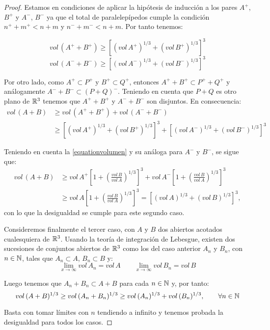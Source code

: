 \begin{proof}
Estamos en condiciones de aplicar la hipótesis de inducción a los pares $A^+$, $B^+$ y $A^-$, $B^-$ ya que el total de paralelepípedos cumple la condición $n^+ + m^+ < n + m$ y $n^- + m^- < n + m$. Por tanto tenemos:

\begin{equation*}
    vol \, (A^+ + B^+) \geq \left[ (vol \, A^+)^{1/3} + (vol \, B^+)^{1/3} \right]^3
\end{equation*}
\begin{equation*}
    vol \, (A^- + B^-) \geq \left[ (vol \, A^-)^{1/3} + (vol \, B^-)^{1/3} \right]^3
\end{equation*}

Por otro lado, como $A^+ \subset P^+$ y $B^+ \subset Q^+$, entonces $A^+ + B^+ \subset P^+ + Q^+$ y análogamente $A^- + B^- \subset (P+Q)^-$. Teniendo en cuenta que $P+Q$ es otro plano de $\mathbb{R}^3$ tenemos que $A^+ + B^+$ y $A^- + B^-$ son disjuntos. En consecuencia:
%
\begin{align*}
    vol \, (A+B) &\geq vol \,(A^+ + B^+) + vol \,(A^- + B^-) \\ 
    &\geq \left[ (vol \, A^+)^{1/3} + (vol \, B^+)^{1/3} \right]^3 + \left[ (vol \, A^-)^{1/3} + (vol \, B^-)^{1/3} \right]^3
\end{align*}

Teniendo en cuenta la \ref{equationvolumen} y su análoga para $A^-$ y $B^-$, se sigue que:
%
\begin{align*}
    vol \, (A+B) &\geq vol \, A^+ \left[ 1 + \left( \frac{vol \, B}{vol \, A} \right)^{1/3}  \right]^3 + vol \, A^- \left[ 1 + \left( \frac{vol \, B}{vol \, A} \right)^{1/3}  \right]^3 \\
    &\geq vol \, A \left[ 1 + \left( \frac{vol \, B}{vol \, A} \right)^{1/3}  \right]^3 = \left[ (vol \, A)^{1/3} + (vol \, B)^{1/3} \right]^3,
\end{align*}
%
con lo que la desigualdad se cumple para este segundo caso.

Consideremos finalmente el tercer caso, con $A$ y $B$ dos abiertos acotados cualesquiera de $\mathbb{R}^3$. Usando la teoría de integración de Lebesgue, existen dos sucesiones de conjuntos abiertos de $\mathbb{R}^3$ como los del caso anterior $A_n$ y $B_n$, con $n \in \mathbb{N}$, tales que $A_n \subset A$, $B_n \subset B$ y:
%
\begin{equation*}
    \lim_{x \to \infty} vol \, A_n = vol \, A \qquad \lim_{x \to \infty} vol \, B_n = vol \, B
\end{equation*}

Luego tenemos que $A_n + B_n \subset A + B$ para cada $n \in \mathbb{N}$ y, por tanto:
%
\begin{equation*}
    vol \, (A+B)^{1/3} \geq vol \, (A_n+B_n)^{1/3} \geq vol \, (A_n) ^{1/3} + vol \, (B_n)^{1/3}, \qquad \forall n \in \mathbb{N}
\end{equation*}

Basta con tomar límites con $n$ tendiendo a infinito y tenemos probada la desigualdad para todos los casos.
\end{proof}


